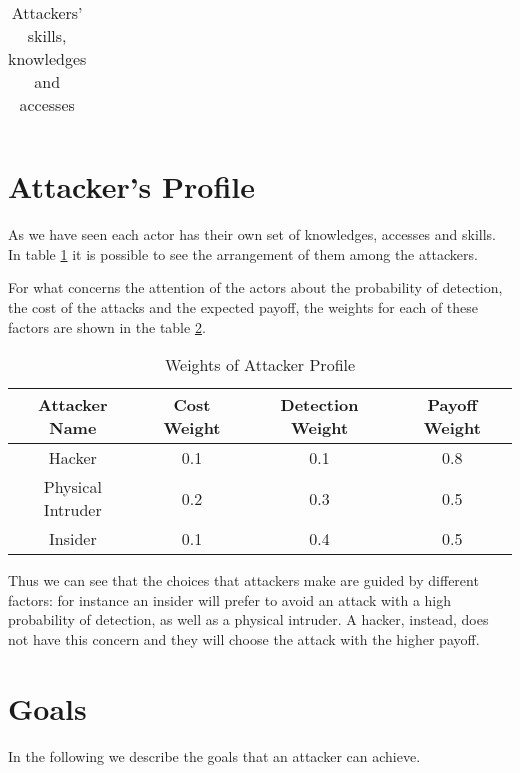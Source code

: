 \begin{table}[htpb]
\begin{tabular}{|c|c|c|c|}
	\end{tabular}
	\caption{Attackers' skills, knowledges and accesses}
	\label{tab:profiles}
\end{table}

\section{Attacker's Profile}
\noindent As we have seen each actor has their own set of knowledges, accesses and skills. In table \ref{tab:profiles} it is possible to see the arrangement of them among the attackers.


\noindent For what concerns the attention of the actors about the probability of detection, the cost of the attacks and the expected payoff, the weights for each of these factors are shown in the table \ref{tab:weights}.

\begin{table}[htpb]
	\centering
	\begin{tabular}{|c|c|c|c|}
		\hline
		\textbf{Attacker Name} & \textbf{Cost Weight} & \textbf{Detection Weight} & \textbf{Payoff Weight} \\ \hline
		Hacker                 & 0.1                    & 0.1                       & 0.8                    \\ \hline
		Physical Intruder      & 0.2                  & 0.3                       & 0.5                    \\ \hline
		Insider                & 0.1                  & 0.4                       & 0.5                    \\ \hline
	\end{tabular}
	\caption{Weights of Attacker Profile}
	\label{tab:weights}
\end{table}

\noindent  Thus we can see that the choices that attackers make are guided by different factors: for instance an insider will prefer to avoid an attack with a high probability of detection, as well as a physical intruder. A hacker, instead, does not have this concern and they will choose the attack with the higher payoff.

\section{Goals}

\noindent In the following we describe the goals that an attacker can achieve.

